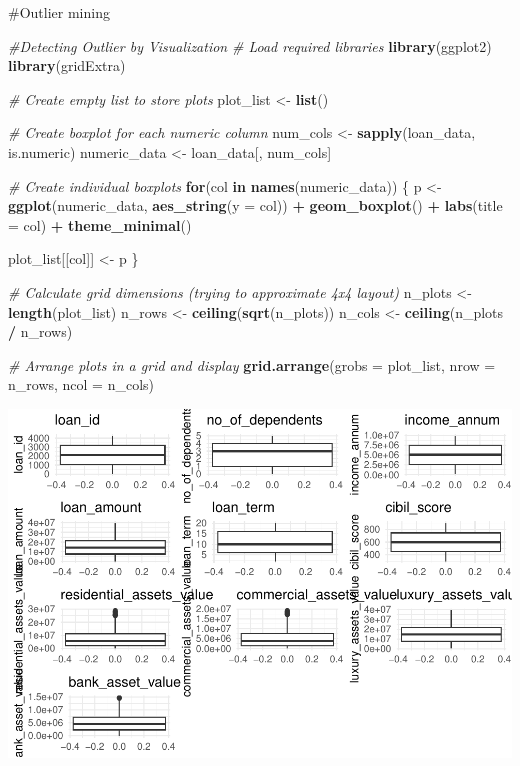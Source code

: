 \documentclass[
]{article}
\newenvironment{Shaded}{\begin{snugshade}}{\end{snugshade}}
\newcommand{\AttributeTok}[1]{\textcolor[rgb]{0.13,0.29,0.53}{#1}}
\newcommand{\CommentTok}[1]{\textcolor[rgb]{0.56,0.35,0.01}{\textit{#1}}}
\newcommand{\ControlFlowTok}[1]{\textcolor[rgb]{0.13,0.29,0.53}{\textbf{#1}}}
\newcommand{\FunctionTok}[1]{\textcolor[rgb]{0.13,0.29,0.53}{\textbf{#1}}}
\newcommand{\NormalTok}[1]{#1}
\newcommand{\OtherTok}[1]{\textcolor[rgb]{0.56,0.35,0.01}{#1}}
\newcommand{\SpecialCharTok}[1]{\textcolor[rgb]{0.81,0.36,0.00}{\textbf{#1}}}
\begin{document}
\#Outlier mining

\begin{Shaded}
\begin{Highlighting}[]
\CommentTok{\#Detecting Outlier by Visualization}
\CommentTok{\# Load required libraries}
\FunctionTok{library}\NormalTok{(ggplot2)}
\FunctionTok{library}\NormalTok{(gridExtra)}

\CommentTok{\# Create empty list to store plots}
\NormalTok{plot\_list }\OtherTok{\textless{}{-}} \FunctionTok{list}\NormalTok{()}

\CommentTok{\# Create boxplot for each numeric column}
\NormalTok{num\_cols }\OtherTok{\textless{}{-}} \FunctionTok{sapply}\NormalTok{(loan\_data, is.numeric)}
\NormalTok{numeric\_data }\OtherTok{\textless{}{-}}\NormalTok{ loan\_data[, num\_cols]}

\CommentTok{\# Create individual boxplots}
\ControlFlowTok{for}\NormalTok{(col }\ControlFlowTok{in} \FunctionTok{names}\NormalTok{(numeric\_data)) \{}
\NormalTok{  p }\OtherTok{\textless{}{-}} \FunctionTok{ggplot}\NormalTok{(numeric\_data, }\FunctionTok{aes\_string}\NormalTok{(}\AttributeTok{y =}\NormalTok{ col)) }\SpecialCharTok{+} 
    \FunctionTok{geom\_boxplot}\NormalTok{() }\SpecialCharTok{+}
    \FunctionTok{labs}\NormalTok{(}\AttributeTok{title =}\NormalTok{ col) }\SpecialCharTok{+}
    \FunctionTok{theme\_minimal}\NormalTok{()}
  
\NormalTok{  plot\_list[[col]] }\OtherTok{\textless{}{-}}\NormalTok{ p}
\NormalTok{\}}

\CommentTok{\# Calculate grid dimensions (trying to approximate 4x4 layout)}
\NormalTok{n\_plots }\OtherTok{\textless{}{-}} \FunctionTok{length}\NormalTok{(plot\_list)}
\NormalTok{n\_rows }\OtherTok{\textless{}{-}} \FunctionTok{ceiling}\NormalTok{(}\FunctionTok{sqrt}\NormalTok{(n\_plots))}
\NormalTok{n\_cols }\OtherTok{\textless{}{-}} \FunctionTok{ceiling}\NormalTok{(n\_plots }\SpecialCharTok{/}\NormalTok{ n\_rows)}

\CommentTok{\# Arrange plots in a grid and display}
\FunctionTok{grid.arrange}\NormalTok{(}\AttributeTok{grobs =}\NormalTok{ plot\_list, }\AttributeTok{nrow =}\NormalTok{ n\_rows, }\AttributeTok{ncol =}\NormalTok{ n\_cols)}
\end{Highlighting}
\end{Shaded}

\includegraphics{Loan_approval_files/figure-latex/unnamed-chunk-10-1.pdf}
\end{document}
